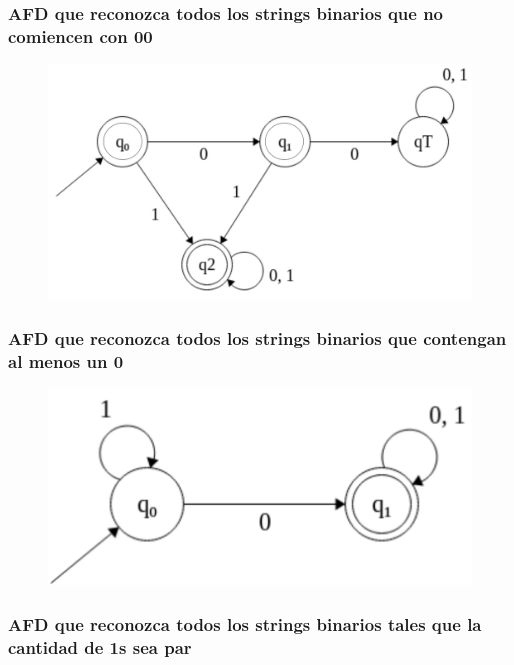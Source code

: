 \documentclass[11pt]{article}
\begin{document}
    \subsubsection{AFD que reconozca todos los strings binarios que no comiencen con 00}

    \begin{figure}[H]
        \centering
        \includegraphics[width=\textwidth]{img/afd/afd-7}\label{fig:figure7}
    \end{figure}

    \subsubsection{AFD que reconozca todos los strings binarios que contengan al menos un 0}

    \begin{figure}[H]
        \centering
        \includegraphics[width=\textwidth]{img/afd/afd-8}\label{fig:figure8}
    \end{figure}

    \subsubsection{AFD que reconozca todos los strings binarios tales que la cantidad de 1s sea par}
\end{document}
